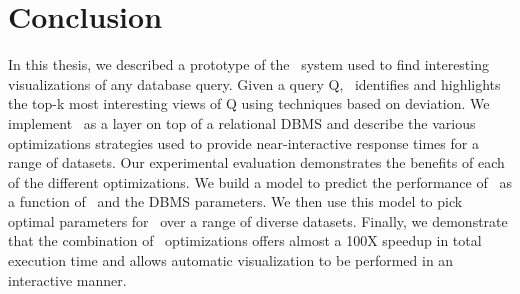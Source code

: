 \chapter{Conclusion}

In this thesis, we described a prototype of the \SeeDB\ system used to find
interesting visualizations of any database query. Given a query Q, \SeeDB\
identifies and highlights the top-k most interesting views of Q using techniques
based on deviation. We implement \SeeDB\ as a layer on top of a relational DBMS
and describe the various optimizations strategies used to provide
near-interactive response times for a range of datasets. Our experimental
evaluation demonstrates the benefits of each of the different optimizations. We
build a model to predict the performance of \SeeDB\ as a function of \SeeDB\
and the DBMS parameters. We then use this model to pick optimal
parameters for \SeeDB\ over a range of diverse datasets. Finally, we
demonstrate that the combination of \SeeDB\ optimizations offers almost a 100X
speedup in total execution time and allows automatic visualization to be
performed in an interactive manner.

